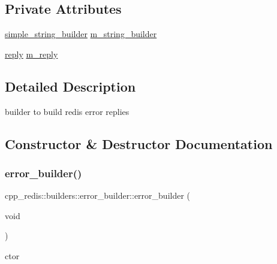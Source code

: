 \subsection*{Private Attributes}
\begin{DoxyCompactItemize}
\item 
\hyperlink{classcpp__redis_1_1builders_1_1simple__string__builder}{simple\+\_\+string\+\_\+builder} \hyperlink{classcpp__redis_1_1builders_1_1error__builder_abf711b6412187467e6a6fe77ca0cc1b7}{m\+\_\+string\+\_\+builder}
\item 
\hyperlink{classcpp__redis_1_1reply}{reply} \hyperlink{classcpp__redis_1_1builders_1_1error__builder_abe93a1cef2b5c63f7d1879c78af68fe7}{m\+\_\+reply}
\end{DoxyCompactItemize}


\subsection{Detailed Description}
builder to build redis error replies 

\subsection{Constructor \& Destructor Documentation}
\mbox{\label{classcpp__redis_1_1builders_1_1error__builder_abbc5e14b66702ec8b210fb1d288d2423}} 
\subsubsection{\texorpdfstring{error\+\_\+builder()}{error\_builder()}\hspace{0.1cm}{\footnotesize\ttfamily [1/2]}}
{\footnotesize\ttfamily cpp\+\_\+redis\+::builders\+::error\+\_\+builder\+::error\+\_\+builder (\begin{DoxyParamCaption}\item[{void}]{ }\end{DoxyParamCaption})\hspace{0.3cm}{\ttfamily [default]}}



ctor 

